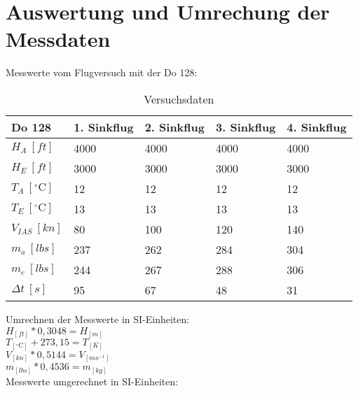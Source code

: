 \chapter{Auswertung und Umrechung der Messdaten}
\label{c:Auswertung}

Messwerte vom Flugversuch mit der Do 128: 

\begin{table}[h]
	\centering
	\begin{tabular}{| l | l | l | l | l | }
\hline
	Do 128 & 1. Sinkflug & 2. Sinkflug & 3. Sinkflug & 4. Sinkflug \\ \hline
	$H_A\ [ft]$ & 4000 & 4000 & 4000 & 4000 \\ \hline
	$H_E\ [ft]$  & 3000 & 3000 & 3000 & 3000 \\ \hline
	$T_A\ [^\circ\text{C}]$  & 12 & 12 & 12 & 12 \\ \hline
	$T_E\ [^\circ\text{C}]$  & 13 & 13 & 13 & 13 \\ \hline
	$V_{IAS}\ [kn]$ & 80 & 100 & 120 & 140 \\ \hline
	$m_a\ [lbs]$ & 237 & 262 & 284 & 304 \\ \hline
	$m_e\ [lbs]$ & 244 & 267 & 288 & 306 \\ \hline
	$\Delta t\ [s]$ & 95 & 67 & 48 & 31 \\ \hline
\end{tabular}
	\caption{Versuchsdaten}
	\label{tab:VersuchDaten2}
\end{table}

Umrechnen der Messwerte in SI-Einheiten:\\
$H_{[ft]}*0,3048=H_{[m]} $\\
$T_{[^\circ\text{C}]}+273,15=T_{[K]}$\\
$V_{[kn]}*0,5144=V_{[ms^{-1}]}$\\
$m_{[lbs]}*0,4536=m_{[kg]}$\\

Messwerte umgerechnet in SI-Einheiten:


